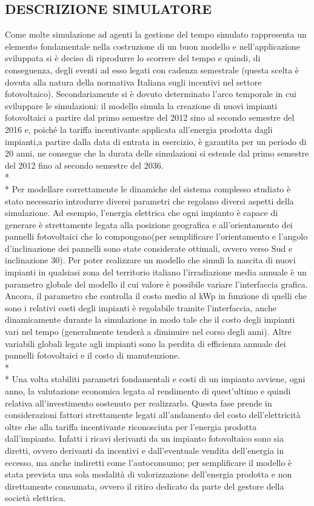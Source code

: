 \documentclass[12pt,a4paper,openright,twoside]{report}
\begin{document}
\subsection{DESCRIZIONE SIMULATORE}
Come molte simulazione ad agenti la gestione del tempo simulato rappresenta un elemento fondamentale nella costruzione di un buon modello e nell'applicazione sviluppata si è deciso di riprodurre lo scorrere del tempo e quindi, di conseguenza, degli eventi ad esso legati con cadenza semestrale (questa scelta è dovuta alla natura della normativa Italiana sugli incentivi nel settore fotovoltaico). Secondariamente si è dovuto determinato l'arco temporale in cui sviluppare le simulazioni: il modello simula la creazione di nuovi impianti fotovoltaici a partire dal primo semestre del 2012 sino al secondo semestre del 2016 e, poiché la tariffa incentivante applicata all'energia prodotta dagli impianti,a partire dalla data di entrata in esercizio, è garantita per un periodo di 20 anni, ne consegue che la durata delle simulazioni si estende dal primo semestre del 2012 fino al secondo semestre del 2036.
\\* \\*
Per modellare correttamente le dinamiche del sistema complesso studiato è stato necessario introdurre diversi parametri che regolano diversi aspetti della simulazione. Ad esempio, l'energia elettrica che ogni impianto è capace di generare è strettamente legata alla posizione geografica e all'orientamento dei pannelli fotovoltaici che lo compongono(per semplificare l'orientamento e l'angolo d'inclinazione dei pannelli sono state considerate ottimali, ovvero verso Sud e inclinazione 30\textdegree). Per poter realizzare un modello che simuli la nascita di nuovi impianti in qualsiasi zona del territorio italiano l'irradiazione media annuale è un parametro globale del modello il cui valore è possibile variare l'interfaccia grafica. Ancora, il parametro che controlla il costo medio al kWp in funzione di quelli che sono i relativi costi degli impianti è regolabile tramite l'interfaccia, anche dinamicamente durante la simulazione in modo tale che il costo degli impianti vari nel tempo (generalmente tenderà a diminuire nel corso degli anni). Altre variabili globali legate agli impianti sono la perdita di efficienza annuale dei pannelli fotovoltaici e il costo di manutenzione.
\\* \\*
Una volta stabiliti parametri fondamentali e costi di un impianto avviene, ogni anno, la valutazione economica legata al rendimento di quest'ultimo e quindi relativa all'investimento sostenuto per realizzarlo. Questa fase prende in considerazioni fattori strettamente legati all'andamento del costo dell'elettricità oltre che alla tariffa incentivante riconosciuta per l'energia prodotta dall'impianto. Infatti i ricavi derivanti da un impianto fotovoltaico sono sia diretti, ovvero derivanti da incentivi e dall'eventuale vendita dell'energia in eccesso, ma anche indiretti come l'autoconsumo; per semplificare il modello è stata prevista una sola modalità di valorizzazione dell'energia prodotta e non direttamente consumata, ovvero il ritiro dedicato da parte del gestore della società elettrica.
\end{document}
